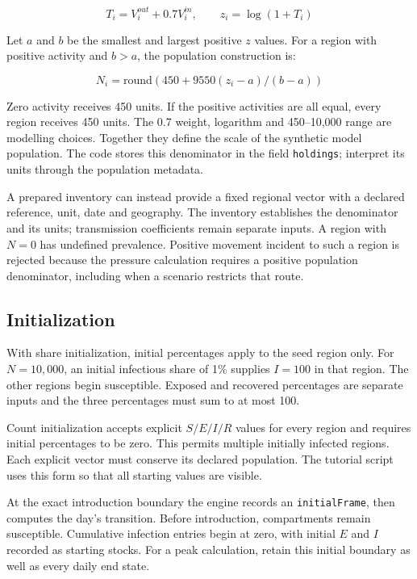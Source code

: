 \documentclass[11pt,a4paper]{article}
\begin{document}
\[
T_i=V^{out}_i+0.7V^{in}_i,\qquad z_i=\log(1+T_i)
\]

Let \(a\) and \(b\) be the smallest and largest positive \(z\) values.
For a region with positive activity and \(b > a\), the population
construction is:

\[
N_i=\mathrm{round}(450+9550(z_i-a)/(b-a))
\]

Zero activity receives 450 units. If the positive activities are all
equal, every region receives 450 units. The 0.7 weight, logarithm and
450--10,000 range are modelling choices. Together they define the scale
of the synthetic model population. The code stores this denominator in
the field \nolinkurl{holdings}; interpret its units through the
population metadata.

A prepared inventory can instead provide a fixed regional vector with a
declared reference, unit, date and geography. The inventory establishes
the denominator and its units; transmission coefficients remain separate
inputs. A region with \(N = 0\) has undefined prevalence. Positive
movement incident to such a region is rejected because the pressure
calculation requires a positive population denominator, including when a
scenario restricts that route.

\subsection{Initialization}\label{initialization}

With share initialization, initial percentages apply to the seed region
only. For \(N = 10{,}000\), an initial infectious share of 1\% supplies
\(I = 100\) in that region. The other regions begin susceptible. Exposed
and recovered percentages are separate inputs and the three percentages
must sum to at most 100.

Count initialization accepts explicit \(S/E/I/R\) values for every
region and requires initial percentages to be zero. This permits
multiple initially infected regions. Each explicit vector must conserve
its declared population. The tutorial script uses this form so that all
starting values are visible.

At the exact introduction boundary the engine records an
\nolinkurl{initialFrame}, then computes the day's transition. Before
introduction, compartments remain susceptible. Cumulative infection
entries begin at zero, with initial \(E\) and \(I\) recorded as starting
stocks. For a peak calculation, retain this initial boundary as well as
every daily end state.
\end{document}
